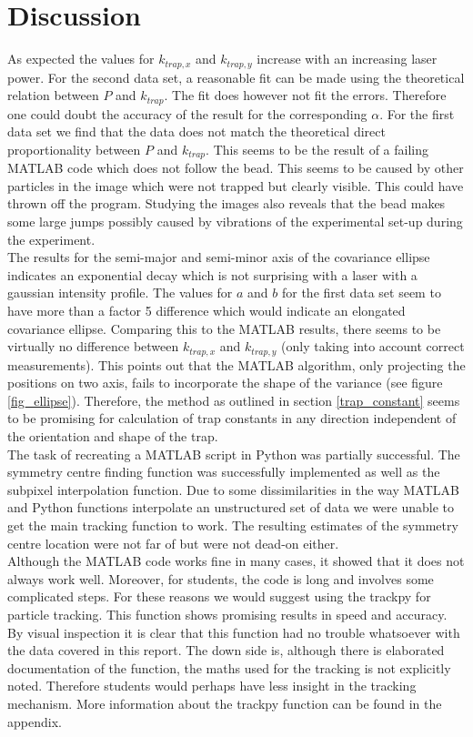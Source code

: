 \section{Discussion}
As expected the values for $k_{trap,x}$ and $k_{trap,y}$ increase with an increasing laser power. For the second data set, a reasonable fit can be made using the theoretical relation between $P$ and $k_{trap}$. The fit does however not fit the errors. Therefore one could doubt the accuracy of the result for the corresponding $\alpha$. For the first data set we find that the data does not match the theoretical direct proportionality between $P$ and $k_{trap}$. This seems to be the result of a failing MATLAB code which does not follow the bead. This seems to be caused by other particles in the image  which were not trapped but clearly visible. This could have thrown off the program. Studying the images also reveals that the bead makes some large jumps possibly caused by vibrations of the experimental set-up during the experiment.  \\ 
The results for the semi-major and semi-minor axis of the covariance ellipse indicates an exponential decay which is not surprising with a laser with a gaussian intensity profile. The values for $a$ and $b$ for the first data set seem to have more than a factor 5 difference which would indicate an elongated covariance ellipse. Comparing this to the MATLAB results, there seems to be virtually no difference between $k_{trap,x}$ and $k_{trap,y}$ (only taking into account correct measurements). This points out that the MATLAB algorithm, only projecting the positions on two axis, fails to incorporate the shape of the variance (see figure \ref{fig_ellipse}). Therefore, the method as outlined in section \ref{trap_constant} seems to be promising for calculation of trap constants in any direction independent of the orientation and shape of the trap. \\
The task of recreating a MATLAB script in Python was partially successful. The symmetry centre finding function was successfully implemented as well as the subpixel interpolation function. Due to some dissimilarities in the way MATLAB and Python functions interpolate an unstructured set of data we were unable to get the main tracking function to work. The resulting estimates of the symmetry centre location were not far of but were not dead-on either. \\
Although the MATLAB code works fine in many cases, it showed that it does not always work well. Moreover, for students, the code is long and involves some complicated steps. For these reasons we would suggest using the trackpy for particle tracking. This function shows promising results in speed and accuracy. By visual inspection it is clear that this function had no trouble whatsoever with the data covered in this report. The down side is, although there is elaborated documentation of the function, the maths used for the tracking is not explicitly noted. Therefore students would perhaps have less insight in the tracking mechanism. More information about the trackpy function can be found in the appendix.
